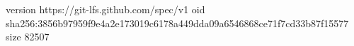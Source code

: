 version https://git-lfs.github.com/spec/v1
oid sha256:3856b97959f9e4a2e173019c6178a449dda09a6546868ce71f7cd33b87f15577
size 82507
